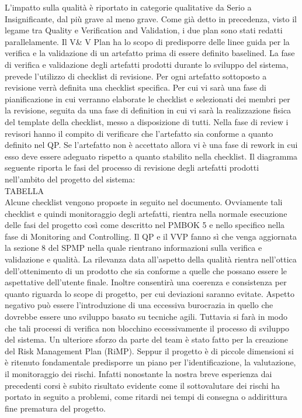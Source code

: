 L’impatto sulla qualità è riportato in categorie qualitative da Serio a Insignificante, dal più grave al meno grave.
Come già detto in precedenza, visto il legame tra Quality e Verification and Validation, i due plan sono stati redatti parallelamente.
Il V\& V Plan ha lo scopo di predisporre delle linee guida per la verifica e la validazione di un artefatto prima di essere definito baselined.
La fase di verifica e validazione degli artefatti prodotti durante lo sviluppo del sistema, prevede l’utilizzo di checklist di revisione. Per ogni artefatto sottoposto a revisione verrà definita una checklist specifica. 
Per cui vi sarà una fase di pianificazione in cui verranno elaborate le checklist e selezionati dei membri per la revisione, seguita da una fase di definition in cui vi sarà la realizzazione fisica del template della checklist, messo a disposizione di tutti.
Nella fase di review i revisori hanno il compito di verificare che l’artefatto sia conforme a quanto definito nel QP.
Se l’artefatto non è accettato allora vi è una fase di rework in cui esso deve essere adeguato rispetto a quanto stabilito nella checklist.
Il diagramma seguente riporta le fasi del processo di revisione degli artefatti prodotti nell’ambito del progetto del sistema:
\\
TABELLA
\\
Alcune checklist vengono proposte in seguito nel documento. Ovviamente tali checklist e quindi monitoraggio degli artefatti, rientra nella normale esecuzione delle fasi del progetto così come descritto nel PMBOK 5 e nello specifico nella fase di Monitoring and Controlling.
Il QP e il VVP fanno sì che venga aggiornata la sezione 8 del SPMP nella quale rientrano informazioni sulla verifica e validazione e qualità.
La rilevanza data all’aspetto della qualità rientra nell’ottica dell’ottenimento di un prodotto che sia conforme a quelle che possano essere le aspettative dell’utente finale.
Inoltre consentirà una coerenza e consistenza per quanto riguarda lo scope di progetto, per cui deviazioni saranno evitate.
Aspetto negativo può essere l’introduzione di una eccessiva burocrazia in quello che dovrebbe essere uno sviluppo basato su tecniche agili. Tuttavia si farà in modo che tali processi di verifica non blocchino eccessivamente il processo di sviluppo del sistema.
Un ulteriore sforzo da parte del team è stato fatto per la creazione del Risk Management Plan (RiMP).
Seppur il progetto è di piccole dimensioni si è ritenuto fondamentale predisporre un piano per l’identificazione, la valutazione, il monitoraggio dei rischi.
Infatti nonostante la nostra breve esperienza dai precedenti corsi è subito risultato evidente come il sottovalutare dei rischi ha portato in seguito a problemi, come ritardi nei tempi di consegna o addirittura fine prematura del progetto.

